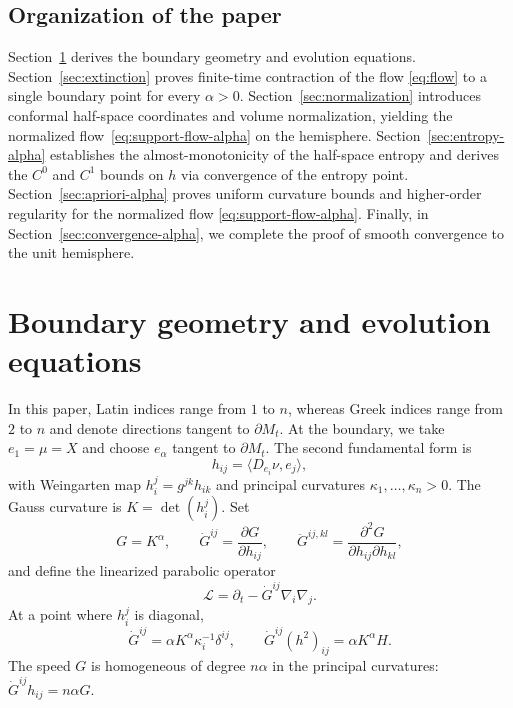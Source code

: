 \documentclass[11pt, reqno]{amsart}
\theoremstyle{remark}
\theoremstyle{definition}
\numberwithin{equation}{section}
\newcommand{\cL}{\mathcal L}
\newcommand{\bd}{\partial}
\begin{document}
\subsection{Organization of the paper}  Section~\ref{sec:prelim} derives the boundary geometry and evolution equations. Section~\ref{sec:extinction} proves finite-time contraction of the flow \eqref{eq:flow} to a single boundary point for every $\alpha>0$. Section~\ref{sec:normalization} introduces conformal half-space coordinates and volume normalization, yielding the normalized flow~\eqref{eq:support-flow-alpha} on the hemisphere. Section~\ref{sec:entropy-alpha} establishes the almost-monotonicity of the half-space entropy and derives the $C^0$ and $C^1$ bounds on $h$ via convergence of the entropy point. Section~\ref{sec:apriori-alpha} proves uniform curvature bounds and higher-order regularity for the normalized flow \eqref{eq:support-flow-alpha}. Finally, in Section~\ref{sec:convergence-alpha}, we complete the proof of smooth convergence to the unit hemisphere.




\section{Boundary geometry and evolution equations}
\label{sec:prelim}

In this paper, Latin indices range from $1$ to $n$, whereas Greek indices range from $2$ to $n$ and denote directions tangent to $\bd M_t$.  At the boundary, we take $e_1=\mu=X$ and choose $e_\alpha$ tangent to $\bd M_t$.  The second fundamental form is
\begin{equation*}
        h_{ij}=\langle D_{e_i}\nu,e_j \rangle,
\end{equation*}
with Weingarten map $h_i^j=g^{jk}h_{ik}$ and principal curvatures $\kappa_1,\ldots,\kappa_n>0$.  The Gauss curvature is $K=\det(h_i^j)$.  Set
\begin{equation*}
        G=K^\alpha,
        \qquad
        \dot G^{ij}=\frac{\bd G}{\bd h_{ij}},
        \qquad
        \ddot G^{ij,kl}=\frac{\bd^2G}{\bd h_{ij}\bd h_{kl}},
\end{equation*}
and define the linearized parabolic operator
\begin{equation}\label{eq:Lalpha}
        \cL=\partial_t-\dot G^{ij}\nabla_i\nabla_j.
\end{equation}
At a point where $h_i^j$ is diagonal,
\begin{equation}\label{eq:G-derivatives-diag}
        \dot G^{ij}=\alpha K^\alpha\kappa_i^{-1}\delta^{ij},
        \qquad
        \dot G^{ij}(h^2)_{ij}=\alpha K^\alpha H.
\end{equation}
The speed $G$ is homogeneous of degree $n\alpha$ in the principal curvatures: $\dot G^{ij}h_{ij}=n\alpha G$.  
\end{document}
